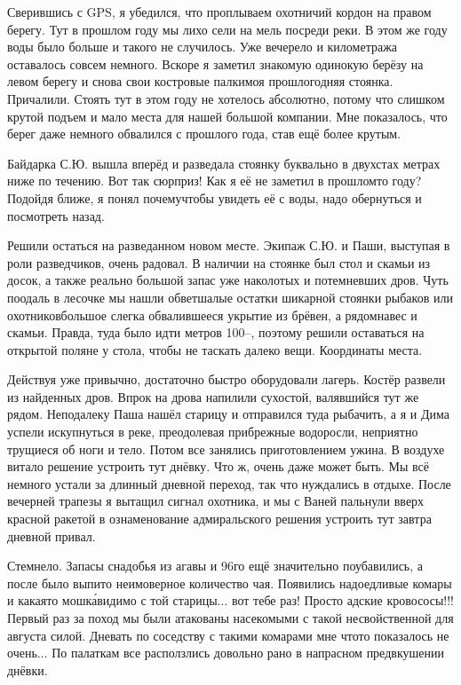 Сверившись с GPS, я убедился, что проплываем охотничий кордон на правом берегу. Тут в прошлом году мы лихо сели на мель посреди реки. В этом же году воды было больше и такого не случилось. Уже вечерело и километража оставалось совсем немного. Вскоре я заметил знакомую одинокую берёзу на левом берегу и снова свои костровые палки\mdash  моя прошлогодняя стоянка. Причалили. Стоять тут в этом году не хотелось абсолютно, потому что слишком крутой подъем и мало места для нашей большой компании. Мне показалось, что берег даже немного обвалился с прошлого года, став ещё более крутым.

Байдарка С.Ю. вышла вперёд и разведала стоянку буквально в двухстах метрах ниже по течению. Вот так сюрприз! Как я её не заметил в прошлом\sdash то году? Подойдя ближе, я понял почему\mdash чтобы увидеть её с воды, надо обернуться и посмотреть назад. 

Решили остаться на разведанном новом месте. Экипаж С.Ю. и Паши, выступая в роли разведчиков, очень радовал. В наличии на стоянке был стол и скамьи из досок, а также реально большой запас уже наколотых и потемневших дров. Чуть поодаль в лесочке мы нашли обветшалые остатки шикарной стоянки рыбаков или охотников\mdash  большое слегка обвалившееся укрытие из брёвен, а рядом\mdash  навес и скамьи. Правда, туда было идти метров 100\thinspace\nobreakdash--, поэтому решили оставаться на открытой поляне у стола, чтобы не таскать далеко вещи. Координаты места\mdash \CoordsChagodoschaSixteenNearKaban. 

Действуя уже привычно, достаточно быстро оборудовали лагерь. Костёр развели из найденных дров. Впрок на дрова напилили сухостой, валявшийся тут же рядом. Неподалеку Паша нашёл старицу и отправился туда рыбачить, а я и Дима успели искупнуться в реке, преодолевая прибрежные водоросли, неприятно трущиеся об ноги и тело. Потом все занялись приготовлением ужина. В воздухе витало решение устроить тут днёвку. Что ж, очень даже может быть. Мы всё немного устали за длинный дневной переход, так что нуждались в отдыхе. После вечерней трапезы я вытащил сигнал охотника, и мы с Ваней пальнули вверх красной ракетой в ознаменование адмиральского решения устроить тут завтра дневной привал.

Стемнело. Запасы снадобья из агавы и 96\sdash го ещё значительно поубавились, а после было выпито неимоверное количество чая. Появились надоедливые комары и какая\sdash то мошк\'{а}\mdash  видимо с той старицы$\ldots$ вот тебе раз! Просто адские кровососы!!! Первый раз за поход мы были атакованы насекомыми с такой несвойственной для августа силой. Дневать по соседству с такими комарами мне что\sdash то показалось не очень$\ldots$ По палаткам все расползлись довольно рано в напрасном предвкушении днёвки. 

\begin{center}
\end{center}
